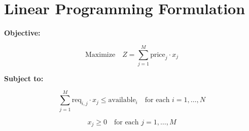 \documentclass{article}
\begin{document}
\section*{Linear Programming Formulation}

\textbf{Objective:}

\[
\text{Maximize} \quad Z = \sum_{j=1}^{M} \text{price}_j \cdot x_j
\]

\textbf{Subject to:}

\[
\sum_{j=1}^{M} \text{req}_{i,j} \cdot x_j \leq \text{available}_i \quad \text{for each } i = 1, \ldots, N
\]

\[
x_j \geq 0 \quad \text{for each } j = 1, \ldots, M
\]
\end{document}
